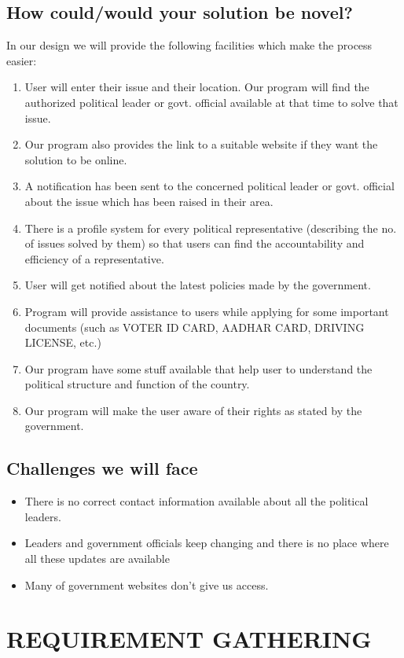 \documentclass[manuscript,screen,review]{acmart}
\begin{document}
\subsection{How could/would your solution be novel?}
In our design we will provide the following facilities which make the process easier:
\begin{enumerate}
    \item User will enter their issue and their location. Our program will find the authorized political leader or govt. official available at that time to solve that issue.
    \item Our program also provides the link to a suitable website if they want the solution to be online.
    \item A notification has been sent to the concerned political leader or govt. official about the issue which has been raised in their area.
    \item There is a profile system for every political representative (describing the no. of issues solved by them) so that users can find the accountability and efficiency of a representative.
    \item  User will get notified about the latest policies made by the government.
    \item Program will provide assistance to users while applying for some important documents (such as VOTER ID CARD, AADHAR CARD, DRIVING LICENSE, etc.) 
    \item Our program have some stuff available that help user to understand the political structure and function of the country.
    \item Our program will make the user aware of their rights as stated by the government.
\end{enumerate}

\subsection{Challenges we will face}
\begin{itemize}
    \item There is no correct contact information available about all the political leaders.
    \item Leaders and government officials keep changing and there is no place where all these updates are available
    \item Many of government websites don’t give us access.
\end{itemize}

\section{REQUIREMENT GATHERING}
\end{document}
